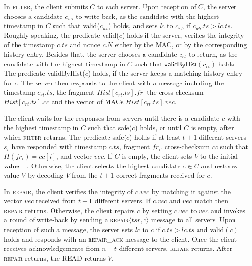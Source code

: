 \documentclass[10pt,conference,compsocconf]{IEEEtran}
\newcommand{\nonce}{N}
\begin{document}
In \textsc{filter}, the client submits $C$ to each server. Upon reception of $C$, the server chooses a candidate $c_{wb}$ to write-back, as the candidate with the highest timestamp in $C$ such that \textsf{valid}($c_{wb}$) holds, and sets $lc$ to $c_{wb}$ if $c_{wb}.ts > lc.ts$. Roughly speaking, the predicate \textsf{valid}($c$) holds if the server, verifies the integrity of the timestamp $c.ts$ and nonce $c.\nonce$ either by the MAC, or by the corresponding history entry. Besides that, the server chooses a candidate $c_{rt}$ to return, as the candidate with the highest timestamp in $C$ such that $\textsf{validByHist}(c_{rt})$ holds. The predicate \textsf{validByHist}($c$) holds, if the server keeps a matching history entry for $c$. The server then responds to the client with a message including the timestamp $c_{rt}.ts$, the fragment $Hist[c_{rt}.ts].fr$, the cross-checksum $Hist[c_{rt}.ts].cc$ and the vector of MACs $Hist[c_{rt}.ts].vec$.

The client waits for the responses from servers until there is a candidate $c$ with the highest timestamp in $C$ such that \textsf{safe}($c$) holds, or until $C$ is empty, after which \textsc{filter} returns. The predicate \textsf{safe}($c$) holds if at least $t+1$ different servers $s_i$ have responded with timestamp $c.ts$, fragment $fr_i$,  cross-checksum $cc$ such that $H(fr_i) = cc[i]$, and vector $vec$.
If $C$ is empty, the client sets $V$ to the initial value $\bot$. Otherwise, the client selects the highest candidate $c \in C$ and restores value $V$ by decoding $V$ from the $t+1$ correct fragments received for $c$.

In \textsc{repair}, the client verifies the integrity of $c.vec$ by matching it against the vector $vec$ received from $t+1$ different servers. If $c.vec$ and $vec$ match then \textsc{repair} returns. Otherwise, the client repairs $c$ by setting $c.vec$ to $vec$ and invokes a round of write-back by sending a \textsc{repair}$\langle tsr, c \rangle$ message to all servers. Upon reception of such a message, the server sets $lc$ to $c$ if $c.ts > lc.ts$ and \textsf{valid}$(c)$ holds and responds with an \textsc{repair\_ack} message to the client. Once the client receives acknowledgements from $n-t$ different servers, \textsc{repair} returns. After \textsc{repair} returns, the \textsc{READ} returns $V$.
\end{document}
